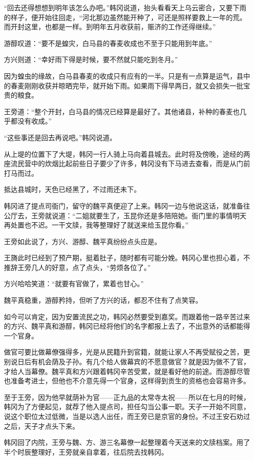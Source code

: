 “回去还得想想到明年该怎么办吧。”韩冈说道，抬头看看天上乌云密合，又要下雨的样子，便开始往回走，“河北那边虽然能开种了，可还是照样要救上一年的荒。而开封这里，也都是一样。到明年五月收获前，赈济的工作还得继续。”

游醇叹道：“要不是蝗灾，白马县的春麦收成也不至于只能用到年底。”

方兴则道：“幸好雨下得是时候，要不然就只能吃到冬月。”

因为蝗虫的缘故，白马县春麦的收成只有应有的一半。只是有一点算是运气，县中的春麦刚刚收获并晾晒完毕，就开始下雨。如果雨下得早两日，就又会损失一批宝贵的粮食。

王旁道：“整个开封，白马县的情况已经算是最好了。其他诸县，补种的春麦也几乎都没有收成。”

“这些事还是回去再说吧。”韩冈说道。

从上堤的位置下了大堤，韩冈一行人骑上马向着县城去。此时将及傍晚，途经的两座流民营中的炊烟比起前些日子要少了许多，韩冈没有下马进去查看，而是从门前打马而过。

抵达县城时，天色已经黑了，不过雨还未下。

韩冈进了提点司衙门，留守的魏平真便迎了上来。韩冈一边与他说这话，就准备往公厅去，王旁就说道：“二姐就要生了，玉昆你还是多陪陪她。衙门里的事情明天再处置也不迟。一干文牍，我等整理好了就送来给玉昆你看。”

王旁如此说了，方兴、游醇、魏平真纷纷点头应是。

王旖此时已经到了预产期，挺着肚子，随时都有可能分娩。韩冈心里也担心着，不推辞王旁几人的好意，点了点头，“劳烦各位了。”

方兴哈哈笑道：“就要有官做了，累着也甘心。”

魏平真稳重，游醇矜持，但听了方兴的话，都忍不住有了点笑容。

如今可以肯定，因为安置流民之功，韩冈必然要受到嘉奖。而跟着他一路辛苦过来的方兴、魏平真和游醇，韩冈已经将他们的名字都报上去了，不出意外的话都能得一个官身。

做官可要比做幕僚强得多，光是从民籍升到官籍，就能让家人不再受赋役之苦，更别说日后有机会荫及子孙。有几个给人做幕宾的不愿意做官？就是因为做不了官，才给人当幕僚。魏平真和方兴跟着韩冈辛苦受累，就是看好他的前途。而游醇尽管也准备考进士，但他也不介意先得一个官身，这样得到贡生的资格也会容易许多。

至于王旁，因为他早就荫补为官——正九品的太常寺太祝——所以在七月的时候，韩冈为了方便起见，就荐了他入提点司，担任勾当公事一职。天子一开始不同意，说这个职位太过低微，当是以选人出任，而王旁已是京官的身份。不过王安石劝过之后，天子才点头下来。

韩冈回了内院，王旁与魏、方、游三名幕僚一起整理着今天送来的文牍档案。用了半个时辰整理好，王旁就亲自拿着，往后院去找韩冈。

